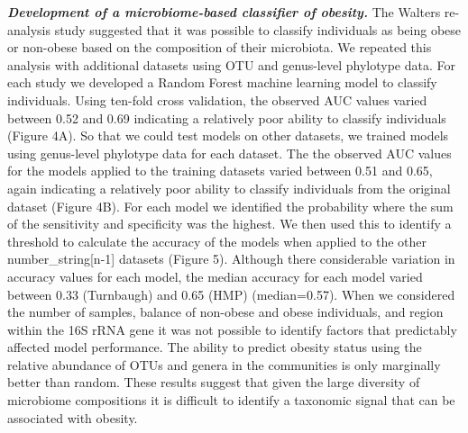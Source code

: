 \documentclass[12pt,]{article}
\begin{document}
\textbf{\emph{Development of a microbiome-based classifier of obesity.}}
The Walters re-analysis study suggested that it was possible to classify
individuals as being obese or non-obese based on the composition of
their microbiota. We repeated this analysis with additional datasets
using OTU and genus-level phylotype data. For each study we developed a
Random Forest machine learning model to classify individuals. Using
ten-fold cross validation, the observed AUC values varied between 0.52
and 0.69 indicating a relatively poor ability to classify individuals
(Figure 4A). So that we could test models on other datasets, we trained
models using genus-level phylotype data for each dataset. The the
observed AUC values for the models applied to the training datasets
varied between 0.51 and 0.65, again indicating a relatively poor ability
to classify individuals from the original dataset (Figure 4B). For each
model we identified the probability where the sum of the sensitivity and
specificity was the highest. We then used this to identify a threshold
to calculate the accuracy of the models when applied to the other
number\_string{[}n-1{]} datasets (Figure 5). Although there considerable
variation in accuracy values for each model, the median accuracy for
each model varied between 0.33 (Turnbaugh) and 0.65 (HMP) (median=0.57).
When we considered the number of samples, balance of non-obese and obese
individuals, and region within the 16S rRNA gene it was not possible to
identify factors that predictably affected model performance. The
ability to predict obesity status using the relative abundance of OTUs
and genera in the communities is only marginally better than random.
These results suggest that given the large diversity of microbiome
compositions it is difficult to identify a taxonomic signal that can be
associated with obesity.
\end{document}
